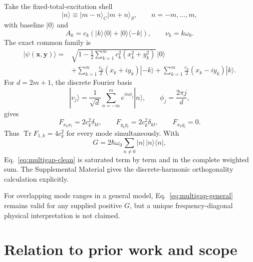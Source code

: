 \documentclass[aps,pra,preprint,nofootinbib]{revtex4-2}
\newcommand{\Tr}{\operatorname{Tr}}
\begin{document}
Take the fixed-total-excitation shell
\begin{equation}
|n\rangle\equiv |m-n\rangle_C|m+n\rangle_S,
\qquad n=-m,\ldots,m,
\end{equation}
with baseline $|0\rangle$ and
\begin{equation}
A_k=c_k(|k\rangle\!\langle0|+|0\rangle\!\langle-k|),
\qquad \nu_k=k\omega_0.
\end{equation}
The exact common family is
\begin{align}
|\psi(\bm x,\bm y)\rangle={}&
\sqrt{1-\frac12\sum_{k=1}^m c_k^2(x_k^2+y_k^2)}\,|0\rangle\nonumber\\
&+\sum_{k=1}^m\frac{c_k}{2}(x_k+i y_k)|-k\rangle
+\sum_{k=1}^m\frac{c_k}{2}(x_k-i y_k)|k\rangle.
\label{eq:star-family}
\end{align}
For $d=2m+1$, the discrete Fourier basis
\begin{equation}
|v_j\rangle=\frac1{\sqrt d}\sum_{n=-m}^{m}e^{in\phi_j}|n\rangle,
\qquad \phi_j=\frac{2\pi j}{d},
\end{equation}
gives
\begin{equation}
F_{x_kx_l}=2c_k^2\delta_{kl},\qquad
F_{y_ky_l}=2c_k^2\delta_{kl},\qquad
F_{x_ky_l}=0.
\label{eq:fourier-F}
\end{equation}
Thus $\Tr F_{1,k}=4c_k^2$ for every mode simultaneously. With
\begin{equation}
G=2\hbar\omega_0\sum_{n\ne0}|n|\,|n\rangle\!\langle n|,
\end{equation}
Eq.~\eqref{eq:multigap-clean} is saturated term by term and in the complete weighted sum. The Supplemental Material gives the discrete-harmonic orthogonality calculation explicitly.

For overlapping mode ranges in a general model, Eq.~\eqref{eq:multigap-general} remains valid for any supplied positive $G$, but a unique frequency-diagonal physical interpretation is not claimed.

\section{Relation to prior work and scope}
\label{sec:prior}
\end{document}
